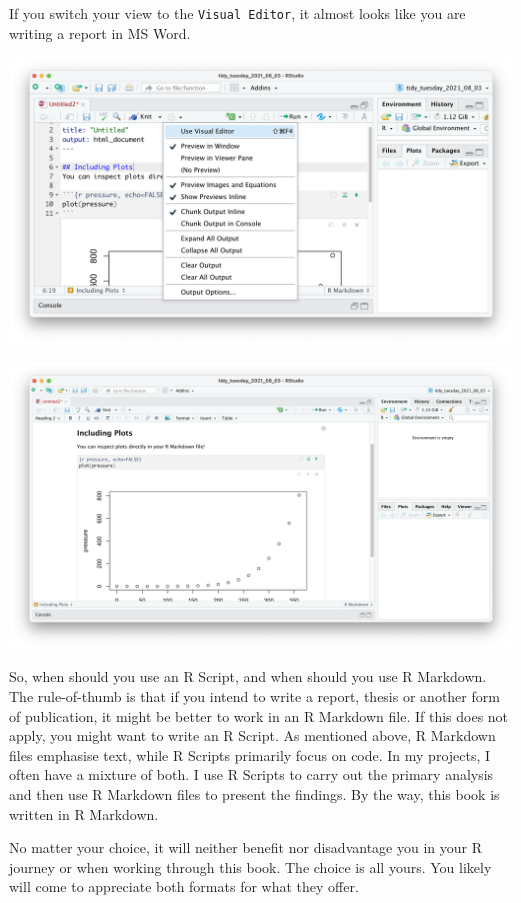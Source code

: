 \documentclass[
]{book}
\begin{document}
If you switch your view to the \texttt{Visual\ Editor}, it almost looks like you are writing a report in MS Word.

\includegraphics{images/chapter_06_img/03_r_markdown/02_r_markdown_visual_editor_menu.png}

\includegraphics{images/chapter_06_img/03_r_markdown/03_r_markdown_visual_editor.png}

So, when should you use an R Script, and when should you use R Markdown. The rule-of-thumb is that if you intend to write a report, thesis or another form of publication, it might be better to work in an R Markdown file. If this does not apply, you might want to write an R Script. As mentioned above, R Markdown files emphasise text, while R Scripts primarily focus on code. In my projects, I often have a mixture of both. I use R Scripts to carry out the primary analysis and then use R Markdown files to present the findings. By the way, this book is written in R Markdown.

No matter your choice, it will neither benefit nor disadvantage you in your R journey or when working through this book. The choice is all yours. You likely will come to appreciate both formats for what they offer.
\end{document}
